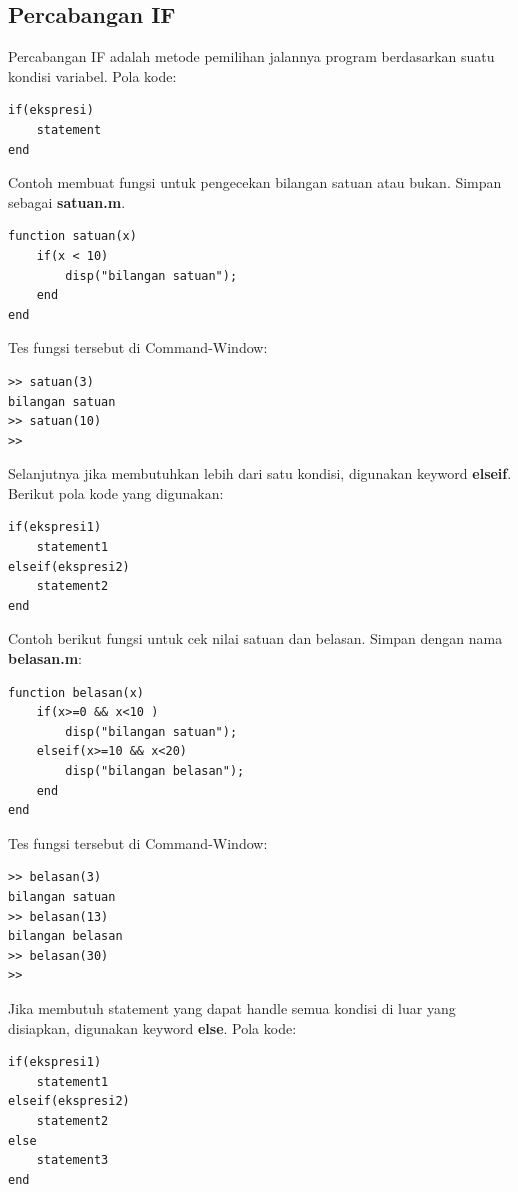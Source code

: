 \documentclass[12pt]{book}
\begin{document}
	\subsection{Percabangan IF}
	
	Percabangan IF adalah metode pemilihan jalannya program berdasarkan suatu kondisi variabel.
	Pola kode:
	\begin{verbatim}
if(ekspresi)
	statement
end
	\end{verbatim}

	Contoh membuat fungsi untuk pengecekan bilangan satuan atau bukan.
	Simpan sebagai \textbf{satuan.m}.
	\begin{verbatim}
function satuan(x)
	if(x < 10)
		disp("bilangan satuan");
	end
end
	\end{verbatim}

	Tes fungsi tersebut di Command-Window:
	\begin{verbatim}
>> satuan(3)
bilangan satuan
>> satuan(10)
>>
	\end{verbatim}

	Selanjutnya jika membutuhkan lebih dari satu kondisi, digunakan keyword \textbf{elseif}.
	Berikut pola kode yang digunakan:
	\begin{verbatim}
if(ekspresi1)
	statement1
elseif(ekspresi2)
	statement2
end
	\end{verbatim}

	Contoh berikut fungsi untuk cek nilai satuan dan belasan.
	Simpan dengan nama \textbf{belasan.m}:
	\begin{verbatim}
function belasan(x)
	if(x>=0 && x<10 )
		disp("bilangan satuan");
	elseif(x>=10 && x<20)
		disp("bilangan belasan");
	end
end
	\end{verbatim}

	Tes fungsi tersebut di Command-Window:
	\begin{verbatim}
>> belasan(3)
bilangan satuan
>> belasan(13)
bilangan belasan
>> belasan(30)
>>
	\end{verbatim}

	Jika membutuh statement yang dapat handle semua kondisi di luar yang disiapkan, digunakan keyword \textbf{else}.
	Pola kode:
	\begin{verbatim}
if(ekspresi1)
	statement1
elseif(ekspresi2)
	statement2
else
	statement3
end
	\end{verbatim}
\end{document}
